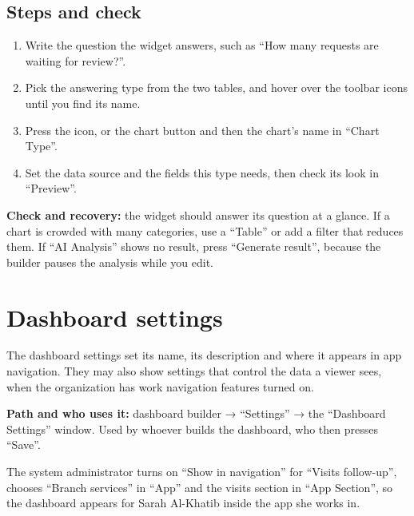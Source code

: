 \subsection{Steps and check}
\begin{enumerate}
\item Write the question the widget answers, such as “How many requests are waiting for review?”.
\item Pick the answering type from the two tables, and hover over the toolbar icons until you find its name.
\item Press the icon, or the chart button and then the chart's name in “Chart Type”.
\item Set the data source and the fields this type needs, then check its look in “Preview”.
\end{enumerate}

\textbf{Check and recovery:} the widget should answer its question at a glance. If a chart is crowded with many categories, use a “Table” or add a filter that reduces them. If “AI Analysis” shows no result, press “Generate result”, because the builder pauses the analysis while you edit.

\clearpage
\section{Dashboard settings}
\label{sec:builder-feature-dashboards-settings}

The dashboard settings set its name, its description and where it appears in app navigation. They may also show settings that control the data a viewer sees, when the organization has work navigation features turned on.

\textbf{Path and who uses it:} dashboard builder → “Settings” → the “Dashboard Settings” window. Used by whoever builds the dashboard, who then presses “Save”.

\begin{rcnote}
The system administrator turns on “Show in navigation” for “Visits follow-up”, chooses “Branch services” in “App” and the visits section in “App Section”, so the dashboard appears for Sarah Al-Khatib inside the app she works in.
\end{rcnote}

